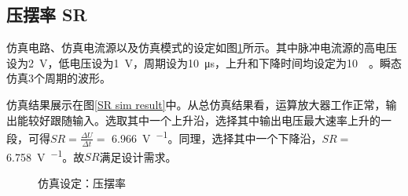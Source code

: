 \documentclass[UTF8]{ctexart}
\numberwithin{figure}{subsection}
\numberwithin{table}{subsection}
\numberwithin{equation}{subsection}
\begin{document}
\subsection{压摆率 SR}
仿真电路、仿真电流源以及仿真模式的设定如图\ref{SR sim settings}所示。其中脉冲电流源的高电压设为\SI[]{2}{\volt}，低电压设为\SI[]{1}{\volt}，周期设为\SI[]{10}{\micro\second}，上升和下降时间均设定为\SI[]{10}{\nano\sec}。瞬态仿真3个周期的波形。

仿真结果展示在图\ref{SR sim result}中。从总仿真结果看，运算放大器工作正常，输出能较好跟随输入。选取其中一个上升沿，选择其中输出电压最大速率上升的一段，可得\(SR = \frac{\Delta U}{\Delta t} = \) \SI[]{6.966}{\volt\per{\micro\second}}。同理，选择其中一个下降沿，\(SR = \) \SI[]{6.758}{\volt\per{\micro\second}}。故\(SR\)满足设计需求。

\begin{figure}[H]
    \centering
    \caption{仿真设定：压摆率}
    \label{SR sim settings}
\end{figure}
\end{document}
